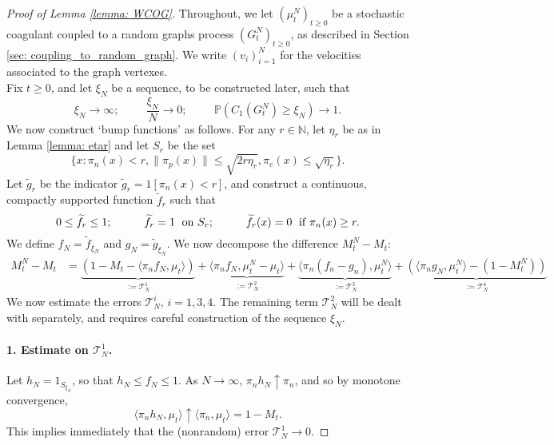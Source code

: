 \begin{proof}[Proof of Lemma \ref{lemma: WCOG}]  Throughout, we let $(\mu^N_t)_{t\geq 0}$ be a stochastic coagulant coupled to a random graphs process $(G^N_t)_{t\geq 0}$, as described in Section \ref{sec: coupling_to_random_graph}. We write $(v_i)_{i=1}^N$ for the velocities associated to the graph vertexes. \medskip \\ Fix $t\ge 0$, and let $\xi_N$ be a sequence, to be constructed later, such that \begin{equation}
       \xi_N\rightarrow \infty; \hspace{1cm} \frac{\xi_N}{N}\rightarrow 0; \hspace{1cm}\mathbb{P}(C_1(G^N_t)\geq \xi_N)\rightarrow 1.
   \end{equation}  We now construct `bump functions' as follows.  For any $r \in \mathbb{N}$, let $\eta_r$ be as in Lemma \ref{lemma: etar} and let $S_r$ be the set \begin{equation}\label{eq: choice of xiN for WCOG}
       \{x: \pi_n(x)< r, \|\pi_p(x)\|\leq \sqrt{2r\eta_r}, \pi_e(x)\leq \sqrt{\eta_r}\}.
   \end{equation} Let $\widetilde{g}_r$ be the indicator $\widetilde{g}_r=1[\pi_n(x)< r]$, and construct a continuous, compactly supported function $\widetilde{f}_r$ such that \begin{equation}
      0\leq \widetilde{f}_r\leq 1;\hspace{1cm} \widetilde{f}_r=1 \hspace{0.1cm} \text{ on } S_r;\hspace{1cm} \widetilde{f}_r(x)=0 \hspace{0.1cm} \text{ if } \pi_n(x)\ge r.
   \end{equation} We define $f_N=\widetilde{f}_{\xi_N}$ and $g_N=\widetilde{g}_{\xi_N}$.  We now decompose the difference $M^N_t-M_t:$ \begin{equation}\label{eq: decomposition of erorr in WCOG}\begin{split} M^N_t-M_t &= \underbrace{(1-M_t-\langle \pi_n f_N, \mu_t\rangle)}_{:=\mathcal{T}^1_N} + \underbrace{\langle \pi_n f_N, \mu^N_t-\mu_t\rangle}_{:=\mathcal{T}^2_N} + \underbrace{\langle \pi_n (f_n-g_n), \mu^N_t\rangle}_{:=\mathcal{T}^3_N} +\underbrace{(
   \langle \pi_n g_N, \mu^N_t\rangle - (1-M^N_t))}_{:=\mathcal{T}^4_N}\end{split} \end{equation} We now estimate the errors $\mathcal{T}^i_N$, $i=1,3,4.$ The remaining term $\mathcal{T}^2_N$ will be dealt with separately, and requires careful construction of the sequence $\xi_N$. \paragraph{1. Estimate on $\mathcal{T}^1_N$.} Let $h_N=1_{S_{\xi_N}}$, so that $h_N \le f_N \le 1$. As $N\rightarrow \infty$, $\pi_n h_N \uparrow \pi_n$, and so by monotone convergence, \begin{equation}
       \langle \pi_n h_N, \mu_t\rangle \uparrow \langle \pi_n, \mu_t\rangle =1-M_t.
   \end{equation} This implies immediately that the (nonrandom) error $\mathcal{T}^1_N \rightarrow 0$.

\end{proof}
